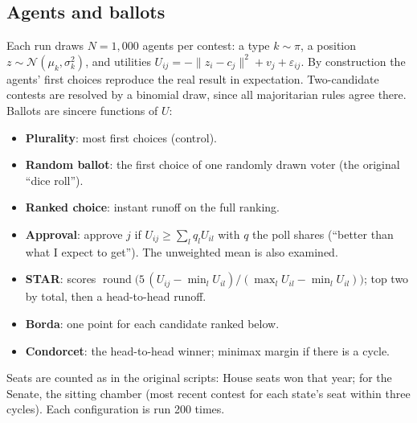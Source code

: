\documentclass[11pt]{article}
\begin{document}
\FloatBarrier
\subsection{Agents and ballots}
Each run draws $N=1{,}000$ agents per contest: a type $k\sim\pi$, a position $z\sim\mathcal N(\mu_k,\sigma_k^2)$, and utilities $U_{ij}=-\lVert z_i-c_j\rVert^2+v_j+\varepsilon_{ij}$. By construction the agents' first choices reproduce the real result in expectation. Two-candidate contests are resolved by a binomial draw, since all majoritarian rules agree there. Ballots are sincere functions of $U$:
\begin{itemize}\itemsep1pt
\item \textbf{Plurality}: most first choices (control).
\item \textbf{Random ballot}: the first choice of one randomly drawn voter (the original ``dice roll'').
\item \textbf{Ranked choice}: instant runoff on the full ranking.
\item \textbf{Approval}: approve $j$ if $U_{ij}\ge\sum_l q_l U_{il}$ with $q$ the poll shares (``better than what I expect to get''). The unweighted mean is also examined.
\item \textbf{STAR}: scores $\operatorname{round}\!\big(5\,(U_{ij}-\min_l U_{il})/(\max_l U_{il}-\min_l U_{il})\big)$; top two by total, then a head-to-head runoff.
\item \textbf{Borda}: one point for each candidate ranked below.
\item \textbf{Condorcet}: the head-to-head winner; minimax margin if there is a cycle.
\end{itemize}
Seats are counted as in the original scripts: House seats won that year; for the Senate, the sitting chamber (most recent contest for each state's seat within three cycles). Each configuration is run 200 times.

\FloatBarrier
\end{document}
